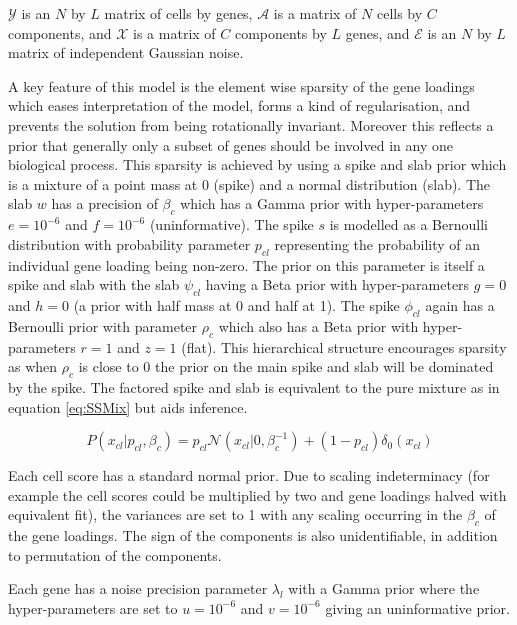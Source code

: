 $\mathcal{Y}$ is an $N$ by $L$ matrix of cells by genes, $\mathcal{A}$ is a matrix of $N$ cells by $C$ components, and $\mathcal{X}$ is a matrix of $C$ components by $L$ genes, and $\mathcal{E}$ is an $N$ by $L$ matrix of independent Gaussian noise.

A key feature of this model is the element wise sparsity of the gene loadings which eases interpretation of the model, forms a kind of regularisation, and prevents the solution from being rotationally invariant. Moreover this reflects a prior that generally only a subset of genes should be involved in any one biological process. This sparsity is achieved by using a spike and slab prior which is a mixture of a point mass at 0 (spike) and a normal distribution (slab). The slab $w$ has a precision of $\beta_{c}$ which has a Gamma prior with hyper-parameters $e = 10^{-6}$ and $f = 10^{-6}$ (uninformative). The spike $s$ is modelled as a Bernoulli distribution with probability parameter $p_{cl}$ representing the probability of an individual gene loading being non-zero. The prior on this parameter is itself a spike and slab with the slab $\psi_{c l}$ having a Beta prior with hyper-parameters $g=0$ and $h=0$ (a prior with half mass at 0 and half at 1). The spike $\phi_{c l}$ again has a Bernoulli prior with parameter $\rho_{c}$ which also has a Beta prior with hyper-parameters $r=1$ and $z=1$ (flat). This hierarchical structure encourages sparsity as when $\rho_{c}$ is close to 0 the prior on the main spike and slab will be dominated by the spike. The factored spike and slab is equivalent to the pure mixture as in equation \ref{eq:SSMix} but aids inference.

\begin{equation}
P\left(x_{c l} | p_{c l}, \beta_{c}\right)=p_{c l} \mathcal{N}\left(x_{c l} | 0, \beta_{c}^{-1}\right)+\left(1-p_{c l}\right) \delta_{0}\left(x_{c l}\right)
\label{eq:SSMix}
\end{equation}

Each cell score has a standard normal prior. Due to scaling indeterminacy (for example the cell scores could be multiplied by two and gene loadings halved with equivalent fit), the variances are set to 1 with any scaling occurring in the $\beta_{c}$ of the gene loadings. The sign of the components is also unidentifiable, in addition to permutation of the components.

Each gene has a noise precision parameter $\lambda_{l}$ with a Gamma prior where the hyper-parameters are set to $u = 10^{-6}$ and $v = 10^{-6}$ giving an uninformative prior. 


